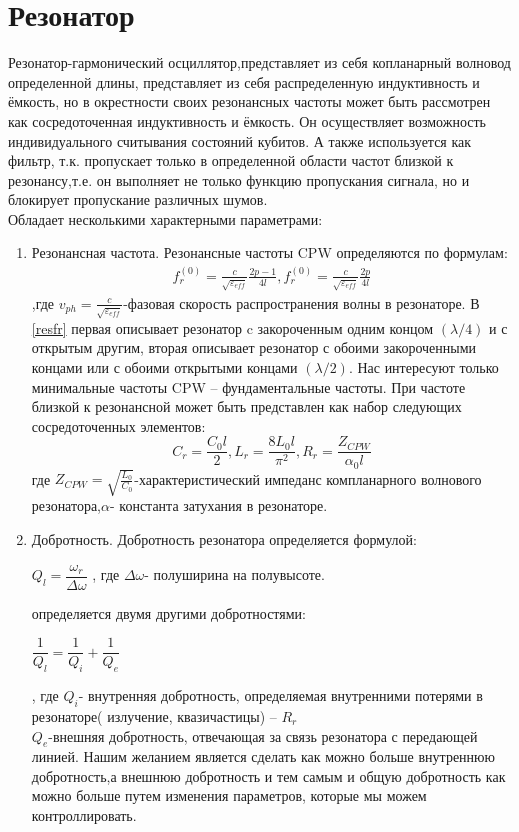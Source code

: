 \documentclass[12pt, a4paper, openany]{book}
\begin{document}
	\section{Резонатор}
Резонатор-гармонический осциллятор,представляет из себя копланарный волновод определенной длины, представляет из себя распределенную индуктивность и ёмкость, но в окрестности своих резонансных частоты может быть рассмотрен как сосредоточенная индуктивность и ёмкость. Он осуществляет возможность индивидуального считывания состояний кубитов. А также используется как фильтр, т.к. пропускает только в определенной области частот близкой к резонансу,т.е. он выполняет не только функцию пропускания сигнала, но и блокирует пропускание различных шумов\cite{Naturwissenschaften2013}.\\
Обладает несколькими характерными параметрами:
\begin{enumerate}
\item Резонансная частота.
Резонансные частоты CPW определяются по формулам:
	\begin{align}
	\label{resfr}
	f^{(0)}_r=\frac{c}{\sqrt{\varepsilon_{eff}}}\frac{2p-1}{4l}, 
	f^{(0)}_r=\frac{c}{\sqrt{\varepsilon_{eff}}}\frac{2p}{4l}
	\end{align}
,где $v_{ph}=\frac{c}{\sqrt{\varepsilon_{eff}}}$-фазовая скорость распространения волны в резонаторе. В \eqref{resfr} первая описывает резонатор c закороченным одним концом $(\lambda/4)$ и с открытым другим, вторая описывает резонатор с обоими закороченными концами или с обоими открытыми концами $(\lambda/2)$. Нас интересуют только минимальные частоты CPW -- фундаментальные частоты. При частоте близкой к резонансной может быть представлен как набор следующих сосредоточенных элементов:
	\begin{equation}
	C_r=\frac{C_0 l}{2},
	L_r=\frac{8L_0 l}{\pi^2},
	R_r=\frac{Z_{CPW}}{\alpha_0 l}
	\end{equation}
где $Z_{CPW}=\sqrt{\frac{L_0}{C_0}}$-характеристический импеданс компланарного волнового резонатора,$\alpha$- константа затухания в резонаторе.
\item Добротность.
Добротность резонатора определяется формулой:
\begin{center}
$Q_l=\dfrac{\omega_r}{\Delta \omega}$
, где $\Delta \omega$- полуширина на полувысоте.
\end{center}
определяется двумя другими добротностями:
\begin{center}
$\dfrac{1}{Q_l}=\dfrac{1}{Q_i}+\dfrac{1}{Q_e}$
\end{center}
, где $Q_i$- внутренняя добротность, определяемая внутренними потерями в резонаторе( излучение, квазичастицы) -- $R_r$\\
$Q_e$-внешняя добротность, отвечающая за связь резонатора с передающей линией. Нашим желанием является сделать как можно больше внутреннюю добротность,а внешнюю добротность и тем самым и общую добротность как можно больше путем изменения параметров, которые мы можем контроллировать.
\end{enumerate}
\end{document}
